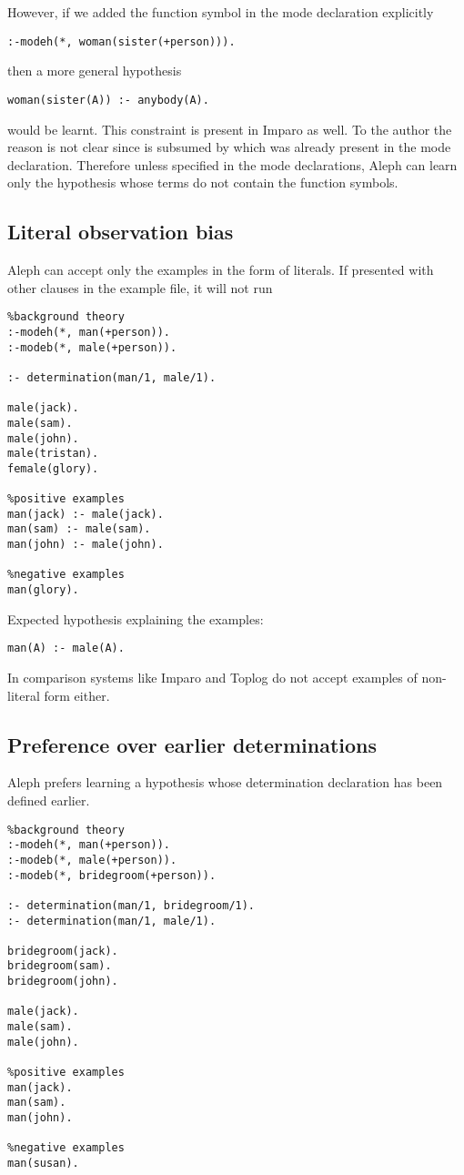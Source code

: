 However, if we added the  function symbol in the mode declaration explicitly
\begin{lstlisting}
:-modeh(*, woman(sister(+person))).
\end{lstlisting}
then a more general hypothesis
\begin{lstlisting}
woman(sister(A)) :- anybody(A).
\end{lstlisting}
would be learnt. This constraint is present in Imparo as well. To the author the reason is not clear since  is subsumed by
 which was already present in the mode declaration. Therefore unless specified in the mode declarations, Aleph can learn only the hypothesis whose terms do not contain the function symbols.

\subsection{Literal observation bias}
Aleph can accept only the examples in the form of literals. If presented with other clauses in the example file, it will not run

\begin{lstlisting}
%background theory
:-modeh(*, man(+person)).
:-modeb(*, male(+person)).

:- determination(man/1, male/1).

male(jack).
male(sam).
male(john).
male(tristan).
female(glory).

%positive examples
man(jack) :- male(jack).
man(sam) :- male(sam).
man(john) :- male(john).

%negative examples
man(glory).
\end{lstlisting}

Expected hypothesis explaining the examples:
\begin{lstlisting}
man(A) :- male(A).
\end{lstlisting}
In comparison systems like Imparo and Toplog do not accept examples of non-literal form either.

\subsection{Preference over earlier determinations}
Aleph prefers learning a hypothesis whose determination declaration has been defined earlier.

\begin{lstlisting}
%background theory
:-modeh(*, man(+person)).
:-modeb(*, male(+person)).
:-modeb(*, bridegroom(+person)).

:- determination(man/1, bridegroom/1).
:- determination(man/1, male/1).

bridegroom(jack).
bridegroom(sam).
bridegroom(john).

male(jack).
male(sam).
male(john).

%positive examples
man(jack).
man(sam).
man(john).

%negative examples
man(susan).
\end{lstlisting}

